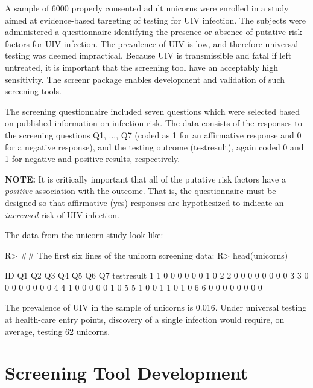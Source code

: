 \documentclass[11pt]{report}
\renewenvironment{Schunk}{\vspace{\topsep}}{\vspace{\topsep}}
\begin{document}
A sample of 6000 properly consented adult unicorns
were enrolled in a study aimed at evidence-based targeting of testing
for UIV infection.  The subjects were administered a questionnaire
identifying the presence or absence of putative risk factors for UIV
infection.  The prevalence of UIV is low, and therefore universal
testing was deemed impractical. Because UIV is
transmissible and fatal if left untreated, it is important that the
screening tool have an acceptably high sensitivity.  The
\textsf{screenr} package enables development and validation of such
screening tools.

The screening questionnaire included seven questions which were
selected based on published information on infection risk. The data
consists of the responses to the screening questions \textsf{Q1, ..., Q7}
(coded as 1 for an affirmative response and 0 for a negative
response), and the testing outcome (\textsf{testresult}), again coded 0 and 1
for negative and positive results, respectively.

\textbf{NOTE:} It is critically important that all of the putative risk
factors have a \emph{positive} association with the outcome.  That is, the
questionnaire must be designed so that affirmative (yes) responses are
hypothesized to indicate an \emph{increased} risk of UIV infection.

The data from the unicorn study look like:

\begin{Schunk}
\begin{Sinput}
R> ## The first six lines of the unicorn screening data:
R> head(unicorns)
\end{Sinput}
\begin{Soutput}
  ID Q1 Q2 Q3 Q4 Q5 Q6 Q7 testresult
1  1  0  0  0  0  0  0  1          0
2  2  0  0  0  0  0  0  0          0
3  3  0  0  0  0  0  0  0          0
4  4  1  0  0  0  0  0  1          0
5  5  1  0  0  1  1  0  1          0
6  6  0  0  0  0  0  0  0          0
\end{Soutput}
\end{Schunk}

The prevalence of UIV in the sample of unicorns is
0.016. Under universal testing
at health-care entry points, discovery of a single
infection would require, on average, testing
62 unicorns.

\section*{Screening Tool Development}
\end{document}
